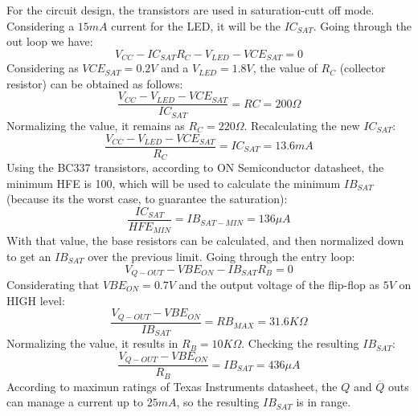 For the circuit design, the transistors are used in saturation-cutt off mode. 
Considering a $15mA$ current for the LED, it will be the $IC_{SAT}$. Going through 
the out loop we have:
\[
    V_{CC} - IC_{SAT}R_C - V_{LED} - VCE_{SAT} = 0    
\]
Considering as $VCE_{SAT} = 0.2V$ and a $V_{LED} = 1.8V$, the value of $R_C$ (collector resistor) can be obtained as follows:
\[
    \frac{V_{CC} - V_{LED} - VCE_{SAT}}{IC_{SAT}} = RC = 200 \Omega    
\]
Normalizing the value, it remains as $R_C = 220\Omega $. Recalculating the new $IC_{SAT}$:
\[
    \frac{V_{CC} - V_{LED} - VCE_{SAT}}{R_C} = IC_{SAT} = 13.6mA   
\]
Using the BC337 transistors, according to ON Semiconductor datasheet, the minimum HFE is 100, which will 
be used to calculate the minimum $IB_{SAT}$ (because its the worst case, to guarantee the saturation):
\[
    \frac{IC_{SAT}}{HFE_{MIN}} = IB_{SAT-MIN} = 136\mu A    
\]
With that value, the base resistors can be calculated, and then normalized down to get an $IB_{SAT}$ over 
the previous limit. Going through the entry loop:
\[
    V_{Q-OUT} - VBE_{ON} - IB_{SAT}R_B = 0
\]
Considerating that $VBE_{ON} = 0.7V$ and the output voltage of the flip-flop as $5V$ on HIGH level:
\[
    \frac{V_{Q-OUT} - VBE_{ON}}{IB_{SAT}} = RB_{MAX} = 31.6K\Omega    
\]
Normalizing the value, it results in $R_B = 10 K \Omega$. Checking the resulting $IB_{SAT}$:
\[
    \frac{V_{Q-OUT} - VBE_{ON}}{R_B} = IB_{SAT} = 436\mu A   
\]
According to maximun ratings of Texas Instruments datasheet, the $Q$ and $\overline{Q}$ outs can manage a current
up to $25mA$, so the resulting $IB_{SAT}$ is in range.




